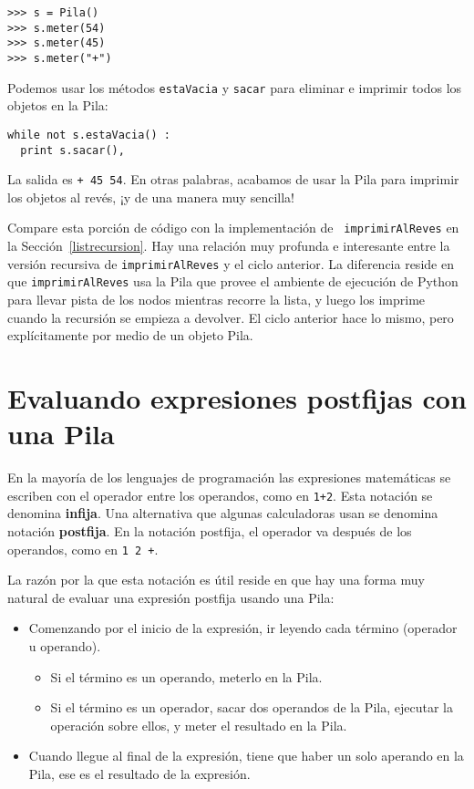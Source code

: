 \beforeverb
\begin{verbatim}
>>> s = Pila()
>>> s.meter(54)
>>> s.meter(45)
>>> s.meter("+")
\end{verbatim}
\afterverb
%
Podemos usar los métodos  \texttt{estaVacia} y \texttt{sacar} para
eliminar e imprimir todos los objetos en la Pila:

\beforeverb
\begin{verbatim}
while not s.estaVacia() :
  print s.sacar(),
\end{verbatim}
\afterverb
%
La salida es \texttt{+ 45 54}.  En otras palabras, acabamos de 
usar la Pila para imprimir los objetos al revés, ¡y de una manera
muy sencilla! 

Compare esta porción de código con la implementación de  {\tt
imprimirAlReves} en la Sección~\ref{listrecursion}.  Hay una 
relación muy profunda e interesante entre la versión recursiva de  
\texttt{imprimirAlReves} y el ciclo anterior. 
La diferencia reside en que \texttt{imprimirAlReves} 
usa la Pila que provee el ambiente de ejecución de Python para llevar
pista de los nodos mientras recorre la lista, y luego los imprime cuando
la recursión se empieza a devolver. El ciclo anterior hace lo mismo, 
pero explícitamente por medio de un objeto Pila.


\section {Evaluando expresiones postfijas con una Pila}

En la mayoría de los lenguajes de programación las expresiones matemáticas
se escriben con el operador entre los operandos, como en \texttt{1+2}.  
Esta notación se denomina  {\bf infija}.  Una alternativa que algunas
calculadoras usan se denomina notación {\bf postfija}.  En la notación
postfija, el operador va después de los operandos, como en \texttt{1 2 +}.

La razón por la que esta notación es útil reside en que hay una forma
muy natural de evaluar una expresión postfija usando una Pila:

\begin{itemize}

\item Comenzando por el inicio de la expresión, ir leyendo cada término
 (operador u operando).

  \begin{itemize}

  \item Si el término es un operando, meterlo en la Pila.

  \item Si el término es un operador, sacar dos operandos de la Pila,
   ejecutar la operación sobre ellos, y meter el resultado en la Pila.

  \end{itemize}

\item Cuando llegue al final de la expresión, tiene que haber un solo
aperando en la Pila, ese es el resultado de la expresión.

\end{itemize}

